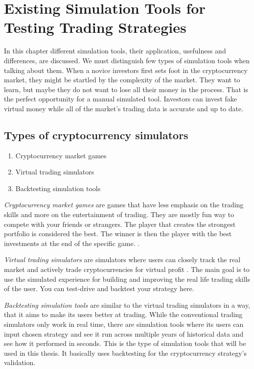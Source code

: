 \chapter{Existing Simulation Tools for Testing Trading Strategies}
\label{chapter-simulation-tools}

In this chapter different simulation tools, their application, usefulness and differences, are discussed. We must distinguish few types of simulation tools when talking about them. When a novice investors first sets foot in the cryptocurrency market, they might be startled by the complexity of the market. They want to learn, but maybe they do not want to lose all their money in the process. That is the perfect opportunity for a manual simulated tool. Investors can invest fake virtual money while all of the market's trading data is accurate and up to date.

\section*{Types of cryptocurrency simulators}

\begin{enumerate}
    \item Cryptocurrency market games
    \item Virtual trading simulators
    \item Backtesting simulation tools
\end{enumerate}

\emph{Cryptocurrency market games} are games that have less emphasis on the trading skills and more on the entertainment of trading. They are mostly fun way to compete with your friends or strangers. The player that creates the strongest portfolio is considered the best. The winner is then the player with the best investments at the end of the specific game. \cite{top-stocks-crypto-trading-simulators}.

\emph{Virtual trading simulators} are simulators where users can closely track the real market and actively trade cryptocurrencies for virtual profit \cite{top-stocks-crypto-trading-simulators}. The main goal is to use the simulated experience for building and improving the real life trading skills of the user. You can test-drive and backtest your strategy here.

\emph{Backtesting simulation tools} are similar to the virtual trading simulators in a way, that it aims to make its users better at trading. While the conventional trading simulators only work in real time, there are simulation tools where its users can input chosen strategy and see it run across multiple years of historical data and see how it performed in seconds. This is the type of simulation tools that will be used in this thesis. It basically uses backtesting for the cryptocurrency strategy's validation.

